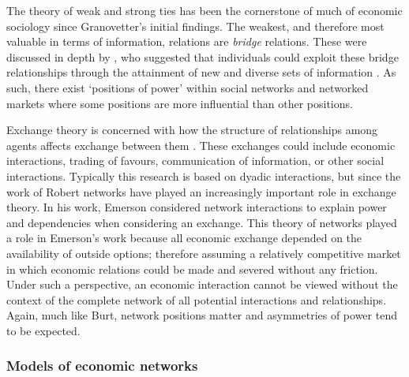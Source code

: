The theory of weak and strong ties has been the cornerstone of much of economic sociology since Granovetter's initial findings. The weakest, and therefore most valuable in terms of information, relations are \emph{bridge} relations. These were discussed in depth by \citet{Burt1992}, who suggested that individuals could exploit these bridge relationships through the attainment of new and diverse sets of information \citep{Burt2004}. As such, there exist `positions of power' within social networks and networked markets where some positions are more influential than other positions.

Exchange theory is concerned with how the structure of relationships among agents affects exchange between them \citep{CookWhitmeyer1992}. These exchanges could include economic interactions, trading of favours, communication of information, or other social interactions. Typically this research is based on dyadic interactions, but since the work of Robert \citet{Emerson1962, Emerson1972a, Emerson1972b, Emerson1976} networks have played an increasingly important role in exchange theory. In his work, Emerson considered network interactions to explain power and dependencies when considering an exchange. This theory of networks played a role in Emerson's work because all economic exchange depended on the availability of outside options; therefore assuming a relatively competitive market in which economic relations could be made and severed without any friction. Under such a perspective, an economic interaction cannot be viewed without the context of the complete network of all potential interactions and relationships. Again, much like Burt, network positions matter and asymmetries of power tend to be expected.

\subsubsection{Models of economic networks}

